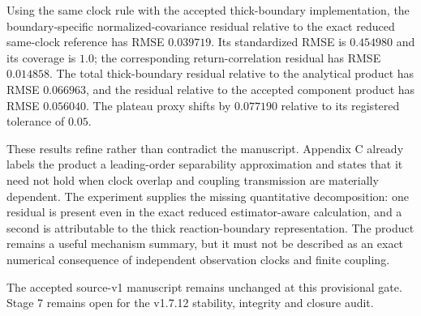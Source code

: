 Using the same clock rule with the accepted thick-boundary implementation, the
boundary-specific normalized-covariance residual relative to the exact reduced
same-clock reference has RMSE $0.039719$.  Its standardized RMSE is $0.454980$
and its coverage is $1.0$; the corresponding return-correlation residual has
RMSE $0.014858$.  The total thick-boundary residual relative to the analytical
product has RMSE $0.066963$, and the residual relative to the accepted
component product has RMSE $0.056040$.  The plateau proxy shifts by $0.077190$
relative to its registered tolerance of $0.05$.

These results refine rather than contradict the manuscript.  Appendix C
already labels the product a leading-order separability approximation and
states that it need not hold when clock overlap and coupling transmission are
materially dependent.  The experiment supplies the missing quantitative
decomposition: one residual is present even in the exact reduced
estimator-aware calculation, and a second is attributable to the thick
reaction-boundary representation.  The product remains a useful mechanism
summary, but it must not be described as an exact numerical consequence of
independent observation clocks and finite coupling.

The accepted source-v1 manuscript remains unchanged at this provisional gate.
Stage 7 remains open for the v1.7.12 stability, integrity and closure audit.
